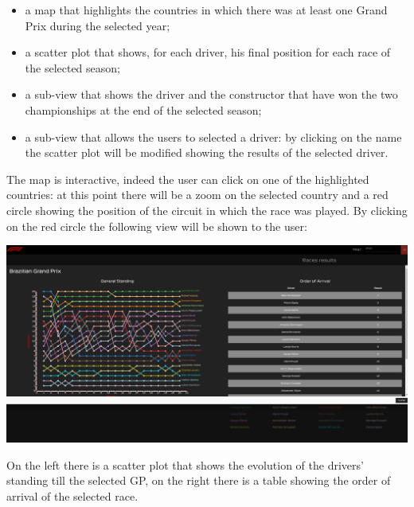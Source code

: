 \documentclass[10pt,twocolumn,letterpaper]{article}
\begin{document}
\begin{itemize}
	\item a map that highlights the countries in which there was at least one Grand Prix during the selected year;
	\item a scatter plot that shows, for each driver, his final position for each race of the selected season;
	\item a sub-view that shows the driver and the constructor that have won the two championships at the end of the selected season;
	\item a sub-view that allows the users to selected a driver: by clicking on the name the scatter plot will be modified showing the results of the selected driver.
\end{itemize}

The map is interactive, indeed the user can click on one of the highlighted countries: at this point there will be a zoom on the selected country and a red circle showing the
position of the circuit in which the race was played. By clicking on the red circle the following view will be shown to the user:

\begin{center}
	\centering
	\includegraphics[width=\columnwidth]{map-clicked}
\end{center}

On the left there is a scatter plot that shows the evolution of the drivers' standing till the selected GP, on the right there is a table showing the order of arrival of the selected
race.
\end{document}
